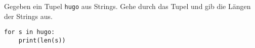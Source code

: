 \question[2]
Gegeben ein Tupel \texttt{hugo} aus Strings. Gehe durch das Tupel und gib
die Längen der Strings aus.
\begin{solutionbox}{4cm}
\begin{lstlisting}
for s in hugo:
    print(len(s))
\end{lstlisting}
\end{solutionbox}
